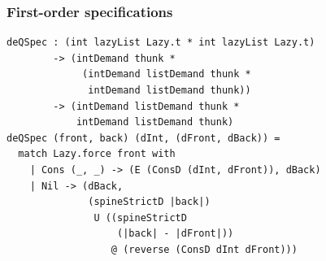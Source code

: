 \documentclass{beamer}
\begin{document}

\begin{frame}[fragile]
\frametitle{First-order specifications}
\begin{verbatim}
deQSpec : (int lazyList Lazy.t * int lazyList Lazy.t)
        -> (intDemand thunk *
             (intDemand listDemand thunk *
              intDemand listDemand thunk))
        -> (intDemand listDemand thunk *
            intDemand listDemand thunk)
deQSpec (front, back) (dInt, (dFront, dBack)) =
  match Lazy.force front with
    | Cons (_, _) -> (E (ConsD (dInt, dFront)), dBack)
    | Nil -> (dBack,
              (spineStrictD |back|)
               U ((spineStrictD
                   (|back| - |dFront|))
                  @ (reverse (ConsD dInt dFront)))
\end{verbatim}
\end{frame}

\end{document}
